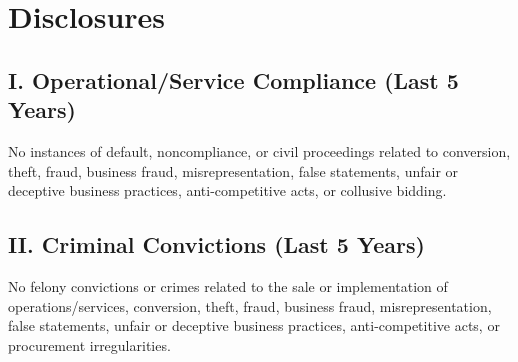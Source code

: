 \section{Disclosures}

\subsection{I. Operational/Service Compliance (Last 5 Years)}
No instances of default, noncompliance, or civil proceedings related to conversion, theft, fraud, business fraud, misrepresentation, false statements, unfair or deceptive business practices, anti-competitive acts, or collusive bidding.

\subsection{II. Criminal Convictions (Last 5 Years)}
No felony convictions or crimes related to the sale or implementation of operations/services, conversion, theft, fraud, business fraud, misrepresentation, false statements, unfair or deceptive business practices, anti-competitive acts, or procurement irregularities.